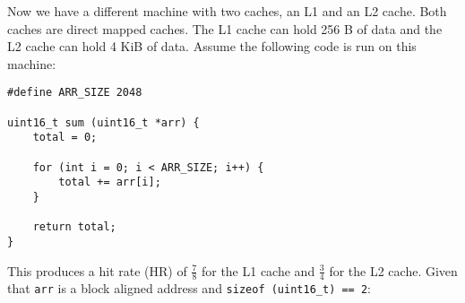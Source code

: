 \UseRawInputEncoding
\begin{blocksection}
\question
Now we have a different machine with two caches, an L1 and an L2 cache. Both caches are direct mapped caches. The L1 cache can hold 256 B of data and the L2 cache can hold 4 KiB of data. Assume the following code is run on this machine:

\begin{verbatim}				
#define ARR_SIZE 2048
					
uint16_t sum (uint16_t *arr) {
    total = 0;
					
    for (int i = 0; i < ARR_SIZE; i++) {
        total += arr[i];					
    }

    return total;
}
\end{verbatim}
						
This produces a hit rate (HR) of $\frac{7}{8}$ for the L1 cache and $\frac{3}{4}$ for the L2 cache. Given that ​\lstinline $arr$​ is a block aligned address and ​\lstinline $sizeof (uint16_t) == 2​$:

\end{blocksection}